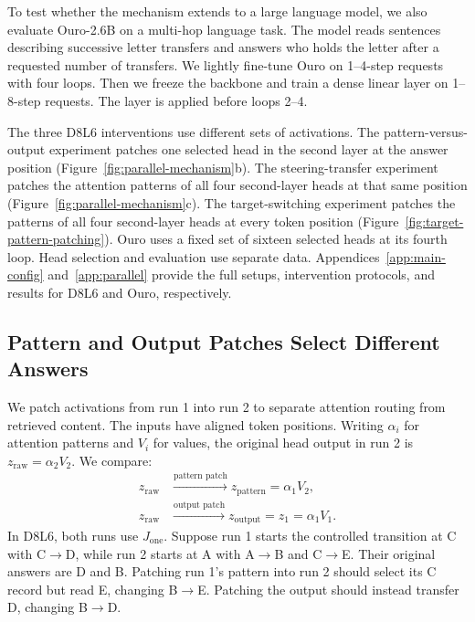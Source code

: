 \documentclass{article}
\begin{document}
To test whether the mechanism extends to a large language model, we also evaluate Ouro-2.6B on a multi-hop language task. The model reads sentences describing successive letter transfers and answers who holds the letter after a requested number of transfers. We lightly fine-tune Ouro on 1--4-step requests with four loops. Then we freeze the backbone and train a dense linear layer on 1--8-step requests. The layer is applied before loops 2--4.

The three D8L6 interventions use different sets of activations. The pattern-versus-output experiment patches one selected head in the second layer at the answer position (Figure~\ref{fig:parallel-mechanism}b). The steering-transfer experiment patches the attention patterns of all four second-layer heads at that same position (Figure~\ref{fig:parallel-mechanism}c). The target-switching experiment patches the patterns of all four second-layer heads at every token position (Figure~\ref{fig:target-pattern-patching}). Ouro uses a fixed set of sixteen selected heads at its fourth loop. Head selection and evaluation use separate data. Appendices~\ref{app:main-config} and~\ref{app:parallel} provide the full setups, intervention protocols, and results for D8L6 and Ouro, respectively.

\subsection{Pattern and Output Patches Select Different Answers}
\label{sec:causal}
We patch activations from run 1 into run 2 to separate attention routing from retrieved content. The inputs have aligned token positions. Writing $\alpha_i$ for attention patterns and $V_i$ for values, the original head output in run 2 is $z_{\mathrm{raw}}=\alpha_2V_2$. We compare:
\begin{equation}
\begin{aligned}
z_{\mathrm{raw}} &\xrightarrow{\text{pattern patch}} z_{\mathrm{pattern}}=\alpha_1V_2,\\
z_{\mathrm{raw}} &\xrightarrow{\text{output patch}} z_{\mathrm{output}}=z_1=\alpha_1V_1.
\end{aligned}
\end{equation}
In D8L6, both runs use $J_{\mathrm{one}}$. Suppose run 1 starts the controlled transition at C with C$\to$D, while run 2 starts at A with A$\to$B and C$\to$E. Their original answers are D and B. Patching run 1's pattern into run 2 should select its C record but read E, changing B$\to$E. Patching the output should instead transfer D, changing B$\to$D.
\end{document}
